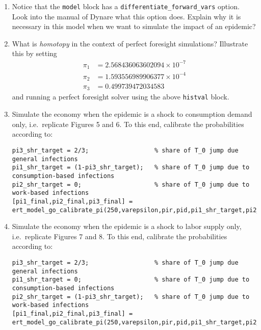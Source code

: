 \begin{enumerate}
\item
Notice that the \texttt{model} block has a \texttt{differentiate\_forward\_vars} option.
Look into the manual of Dynare \parencite{Adjemian.Bastani.Juillard.EtAl_2022_DynareReferenceManual} what this option does.
Explain why it is necessary in this model when we want to simulate the impact of an epidemic?

\item
What is \emph{homotopy} in the context of perfect foresight simulations?
Illustrate this by setting
\begin{align*}
\pi_1 &= 2.568436063602094 \times 10^{-7}\\
\pi_2 &= 1.593556989906377  \times 10^{-4}\\
\pi_3 &= 0.499739472034583
\end{align*}
and running a perfect foresight solver using the above \texttt{histval} block.

\newpage

\item
Simulate the economy when the epidemic is a shock to consumption demand only,
  i.e.\ replicate Figures 5 and 6.
To this end, calibrate the probabilities according to:

{\footnotesize
\begin{lstlisting}[style=Matlab-editor,basicstyle=\mlttfamily\scriptsize]
% calibration targets for shares of pi-terms in T-function in SIR model
pi3_shr_target = 2/3;                  % share of T_0 jump due general infections
pi1_shr_target = (1-pi3_shr_target);   % share of T_0 jump due to consumption-based infections
pi2_shr_target = 0;                    % share of T_0 jump due to work-based infections
[pi1_final,pi2_final,pi3_final] = ert_model_go_calibrate_pi(250,varepsilon,pir,pid,pi1_shr_target,pi2_shr_target,RplusD_target,c_ss,n_ss);
\end{lstlisting}
}

\item
Simulate the economy when the epidemic is a shock to labor supply only,
  i.e.\ replicate Figures 7 and 8.
To this end, calibrate the probabilities according to:

{\footnotesize
\begin{lstlisting}[style=Matlab-editor,basicstyle=\mlttfamily\scriptsize]
pi3_shr_target = 2/3;                  % share of T_0 jump due general infections
pi1_shr_target = 0;                    % share of T_0 jump due to consumption-based infections
pi2_shr_target = (1-pi3_shr_target);   % share of T_0 jump due to work-based infections
[pi1_final,pi2_final,pi3_final] = ert_model_go_calibrate_pi(250,varepsilon,pir,pid,pi1_shr_target,pi2_shr_target,RplusD_target,c_ss,n_ss);
\end{lstlisting}
}


\end{enumerate}
